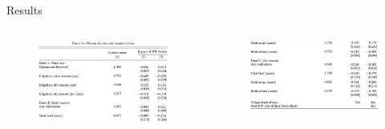 \documentclass[10pt]{beamer}
\begin{document}
\begin{frame}
	{Results}
	\begin{columns}
		\begin{column}{0.5\textwidth}
			\begin{figure}
				\centering
				\includegraphics[width=1\textwidth]{table3_a.png}
			\end{figure}
		\end{column}
		\begin{column}{0.5\textwidth}
			\begin{figure}
				\centering
				\includegraphics[width=1\textwidth]{table3_b.png}
			\end{figure}
		\end{column}
	\end{columns}
\end{frame}
\end{document}
